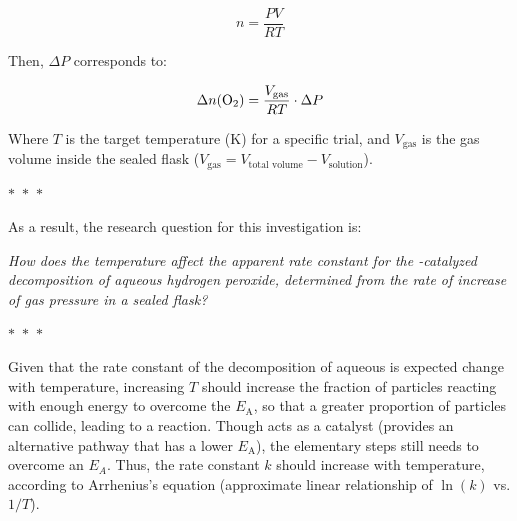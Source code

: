 \documentclass[hyphens]{article}
\begin{document}
\begin{equation}
  n = \frac{PV}{RT}
\end{equation}

\noindent Then, $\Delta{P}$ corresponds to:

\begin{equation}
  \Delta{n(\ce{O2})} = \frac{V_\text{gas}}{RT} \cdot \Delta{P}
\label{eq:oxygen-production-relationship}
\end{equation}


\noindent Where $T$ is the target temperature (K) for a specific trial, and $V_\text{gas}$ is the gas volume inside the sealed flask ($V_\text{gas} = V_\text{total volume} - V_\text{solution}$).

\begin{center}
  $\ast$~$\ast$~$\ast$
\end{center}

\noindent As a result, the research question for this investigation is:

\begin{center}
  \textit{How does the temperature affect the apparent rate constant for the -catalyzed decomposition of aqueous hydrogen peroxide, determined from the rate of increase of gas pressure in a sealed flask?}
\end{center}

\begin{center}
  $\ast$~$\ast$~$\ast$
\end{center}

Given that the rate constant of the decomposition of aqueous  is expected change with temperature, increasing $T$ should increase the fraction of particles reacting with enough energy to overcome the $E_\text{A}$, so that a greater proportion of particles can collide, leading to a reaction. Though  acts as a catalyst (provides an alternative pathway that has a lower $E_\text{A}$), the elementary steps still needs to overcome an $E_{A}$. Thus, the rate constant $k$ should increase with temperature, according to Arrhenius's equation (approximate linear relationship of $\ln{(k)}$ vs. $1/T$).
\end{document}
